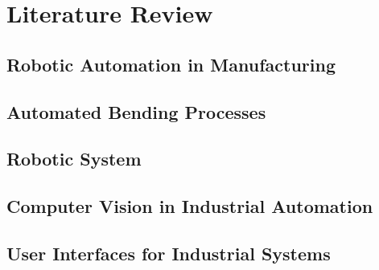 \chapter{Literature Review}

\setcounter{section}{0}
\setcounter{subsection}{0}
\section{Robotic Automation in Manufacturing}


\section{Automated Bending Processes}


\section{Robotic System}


\section{Computer Vision in Industrial Automation}


\section{User Interfaces for Industrial Systems}
